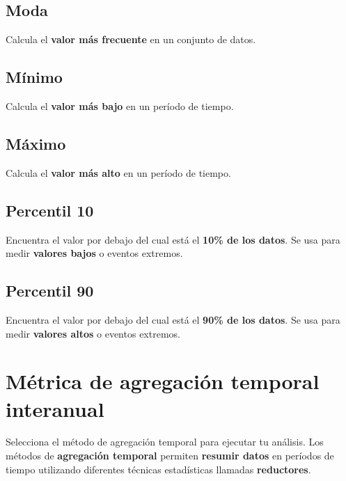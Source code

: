 \documentclass[
]{book}
\begin{document}
\section{\texorpdfstring{\textbf{Moda}}{Moda}}\label{moda}

Calcula el \textbf{valor más frecuente} en un conjunto de datos.

\section{\texorpdfstring{\textbf{Mínimo}}{Mínimo}}\label{muxednimo}

Calcula el \textbf{valor más bajo} en un período de tiempo.

\section{\texorpdfstring{\textbf{Máximo}}{Máximo}}\label{muxe1ximo}

Calcula el \textbf{valor más alto} en un período de tiempo.

\section{\texorpdfstring{\textbf{Percentil 10}}{Percentil 10}}\label{percentil-10}

Encuentra el valor por debajo del cual está el \textbf{10\% de los datos}. Se usa para medir \textbf{valores bajos} o eventos extremos.

\section{\texorpdfstring{\textbf{Percentil 90}}{Percentil 90}}\label{percentil-90}

Encuentra el valor por debajo del cual está el \textbf{90\% de los datos}. Se usa para medir \textbf{valores altos} o eventos extremos.

\chapter{Métrica de agregación temporal interanual}\label{agregacion-temporal-interanual}

Selecciona el método de agregación temporal para ejecutar tu análisis. Los métodos de \textbf{agregación temporal} permiten \textbf{resumir datos} en períodos de tiempo utilizando diferentes técnicas estadísticas llamadas \textbf{reductores}.
\end{document}
